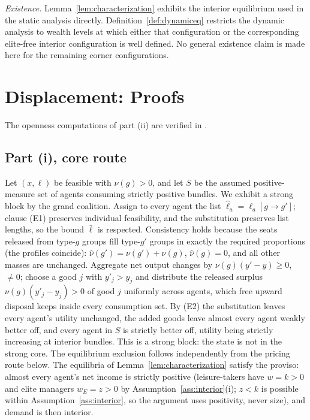\documentclass[12pt,letterpaper]{article}
\theoremstyle{definition}
\begin{document}
\emph{Existence.}
Lemma~\ref{lem:characterization} exhibits the interior equilibrium used in the static analysis directly.
Definition~\ref{def:dynamiceq} restricts the dynamic analysis to wealth levels at which either that configuration or the corresponding elite-free interior configuration is well defined.
No general existence claim is made here for the remaining corner configurations.

\section{Displacement: Proofs}\label{app:displacement}

The openness computations of part (ii) are verified in
.

\subsection{Part (i), core route}
Let $(x,\ell)$ be feasible with $\nu(g)>0$, and let $S$ be the assumed positive-measure set of agents consuming strictly positive bundles.
We exhibit a strong block by the grand coalition.
Assign to every agent the list $\hat\ell_a=\ell_a[g\rightarrow g']$; clause (E1) preserves individual feasibility, and the substitution preserves list lengths, so the bound $\bar\ell$ is respected.
Consistency holds because the seats released from type-$g$ groups fill type-$g'$ groups in exactly the required proportions (the profiles coincide): $\hat\nu(g')=\nu(g')+\nu(g)$, $\hat\nu(g)=0$, and all other masses are unchanged.
Aggregate net output changes by $\nu(g)(y'-y)\geq 0$, $\neq 0$; choose a good $j$ with $y'_j>y_j$ and distribute the released surplus $\nu(g)(y'_j-y_j)>0$ of good $j$ uniformly across agents, which free upward disposal keeps inside every consumption set.
By (E2) the substitution leaves every agent's utility unchanged, the added goods leave almost every agent weakly better off, and every agent in $S$ is strictly better off, utility being strictly increasing at interior bundles.
This is a strong block: the state is not in the strong core.
The equilibrium exclusion follows independently from the pricing route below.
The equilibria of Lemma~\ref{lem:characterization} satisfy the proviso: almost every agent's net income is strictly positive (leisure-takers have $w=k>0$ and elite managers $w_E=z>0$ by Assumption~\ref{ass:interior}(i); $z<k$ is possible within Assumption~\ref{ass:interior}, so the argument uses positivity, never size), and demand is then interior.
\end{document}
